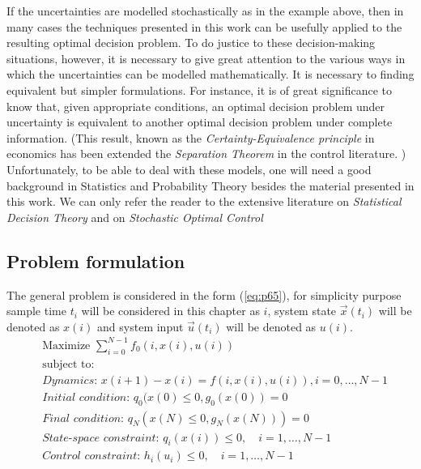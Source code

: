 If the uncertainties are modelled stochastically as in the example above, then in many cases the techniques presented in this work can be usefully applied to the resulting optimal decision  problem. To do justice to these decision-making situations, however, it is necessary to give great attention to the various ways in which the uncertainties can be modelled mathematically. It is necessary to finding equivalent but simpler formulations. For instance, it is of great significance to know that, given appropriate conditions, an optimal decision problem under uncertainty is equivalent to another optimal decision problem under complete information. (This result, known as the \textit{Certainty-Equivalence principle} in economics has been extended the \textit{Separation Theorem} in the control literature. \cite{wonham1968matrix}) Unfortunately, to be able to deal with these models, one will need a good background in Statistics and Probability Theory besides the material presented in this work. We can only refer the reader to the extensive literature on \textit{Statistical Decision Theory} \cite{savage1954problem,blackwell19541954} and on \textit{Stochastic Optimal Control}
\cite{meditch1969stochastic,kushner1971introduction}

\subsection{Problem formulation}\label{s:problemOptT}
\noindent The general problem is considered in the form (\ref{eq:p65}), for simplicity purpose sample time $t_i$ will be considered in this chapter as $i$, system state $\vec{x}(t_i)$ will be denoted as $x(i)$ and system input $\vec{u}(t_i)$ will be denoted as $u(i)$.
\begin{equation}\label{eq:p65}
    \begin{aligned}
    &\text{Maximize } \sum_{i=0}^{N-1}f_0(i,x(i),u(i))\\
    &\text{subject to:}\\
    &\textit{Dynamics: } x(i+1) - x(i) = f(i,x(i),u(i)),i=0,\dots, N-1\\
    &\textit{Initial condition: } q_0(x(0) \le 0, g_0(x(0)) = 0\\
    &\textit{Final condition: } q_N(x(N)\le 0, g_N(x(N))) = 0\\
    &\textit{State-space constraint: } q_i(x(i))\le 0,\quad i = 1,\dots,N-1\\
    &\textit{Control constraint: } h_i(u_i)\le 0,\quad i = 1,\dots,N-1\\
    \end{aligned}
\end{equation}

